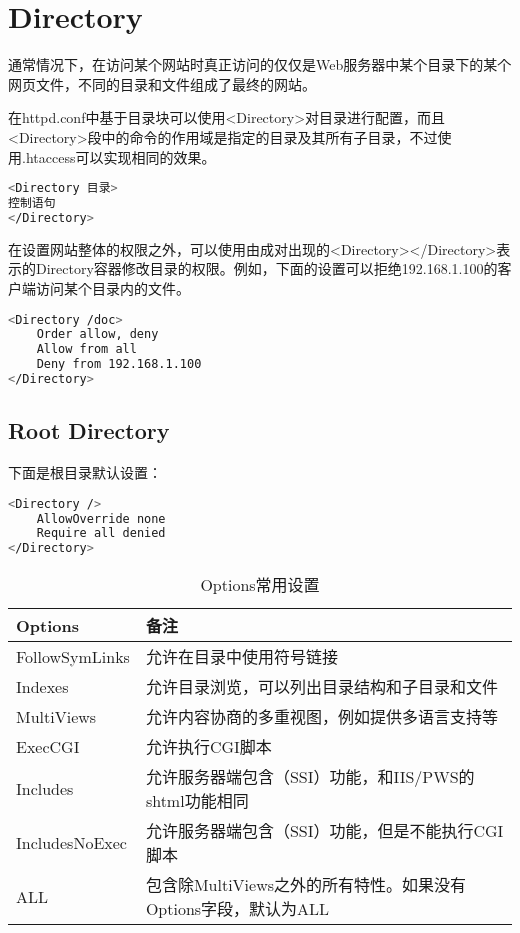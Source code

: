 \section{Directory}





通常情况下，在访问某个网站时真正访问的仅仅是Web服务器中某个目录下的某个网页文件，不同的目录和文件组成了最终的网站。

在httpd.conf中基于目录块可以使用<Directory>对目录进行配置，而且<Directory>段中的命令的作用域是指定的目录及其所有子目录，不过使用.htaccess可以实现相同的效果。


\begin{lstlisting}[language=bash]
<Directory 目录>
控制语句
</Directory>
\end{lstlisting}

在设置网站整体的权限之外，可以使用由成对出现的<Directory></Directory>表示的Directory容器修改目录的权限。例如，下面的设置可以拒绝192.168.1.100的客户端访问某个目录内的文件。


\begin{lstlisting}[language=bash]
<Directory /doc>
	Order allow, deny
	Allow from all
	Deny from 192.168.1.100
</Directory>
\end{lstlisting}




\subsection{Root Directory}

下面是根目录默认设置：

\begin{lstlisting}[language=bash]
<Directory />
    AllowOverride none
    Require all denied
</Directory>
\end{lstlisting}

\begin{table}[htbp]
\centering
\caption{Options常用设置}
\begin{tabular}{|l|l|}
\hline
Options & 备注\\
\hline
FollowSymLinks & 允许在目录中使用符号链接\\
\hline
Indexes & 允许目录浏览，可以列出目录结构和子目录和文件\\
\hline
MultiViews & 允许内容协商的多重视图，例如提供多语言支持等\\
\hline
ExecCGI&允许执行CGI脚本\\
\hline
Includes & 允许服务器端包含（SSI）功能，和IIS/PWS的shtml功能相同\\
\hline
IncludesNoExec&允许服务器端包含（SSI）功能，但是不能执行CGI脚本\\
\hline
ALL&包含除MultiViews之外的所有特性。如果没有Options字段，默认为ALL\\
\hline
\end{tabular}
\end{table}

